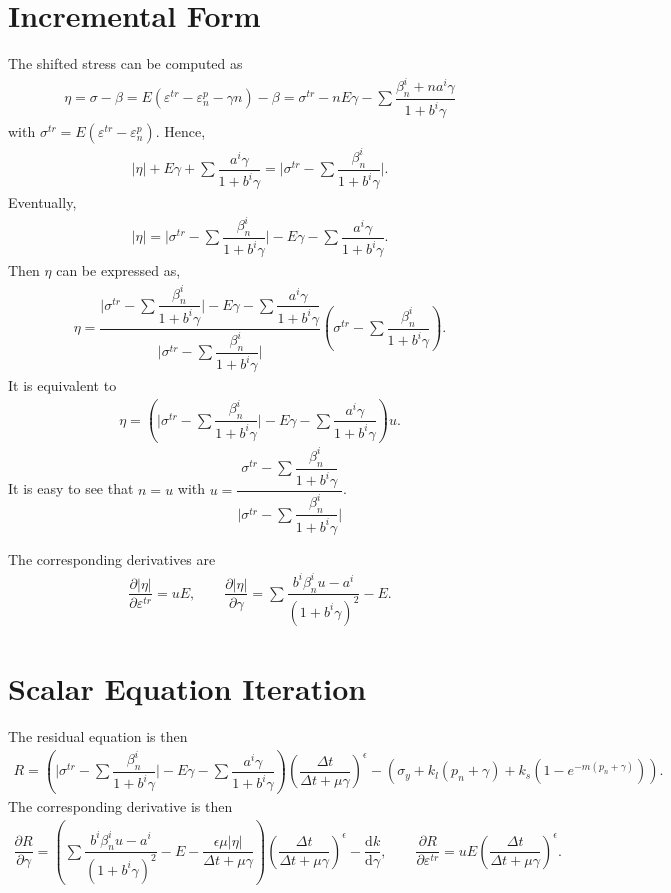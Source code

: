 \documentclass[a4paper,10pt,fleqn]{article}
\newcommand*{\md}[1]{\mathrm{d}#1}
\newcommand*{\pfrac}[2]{\dfrac{\partial#1}{\partial#2}}
\newcommand*{\ddfrac}[2]{\dfrac{\md#1}{\md#2}}
\begin{document}
\section{Incremental Form}
The shifted stress can be computed as
\begin{gather}
\eta=\sigma-\beta=E\left(\varepsilon^{tr}-\varepsilon^p_n-\gamma{}n\right)-\beta=\sigma^{tr}-nE\gamma-\sum\dfrac{\beta_n^i+na^i\gamma}{1+b^i\gamma}
\end{gather}
with $\sigma^{tr}=E(\varepsilon^{tr}-\varepsilon^p_n)$. Hence,
\begin{gather*}
\Big|\eta\Big|+E\gamma+\sum\dfrac{a^i\gamma}{1+b^i\gamma}=\Big|\sigma^{tr}-\sum\dfrac{\beta_n^i}{1+b^i\gamma}\Big|.
\end{gather*}
Eventually,
\begin{gather}
\Big|\eta\Big|=\Big|\sigma^{tr}-\sum\dfrac{\beta_n^i}{1+b^i\gamma}\Big|-E\gamma-\sum\dfrac{a^i\gamma}{1+b^i\gamma}.
\end{gather}
Then $\eta$ can be expressed as,
\begin{gather*}
\eta=\dfrac{\Big|\sigma^{tr}-\sum\dfrac{\beta_n^i}{1+b^i\gamma}\Big|-E\gamma-\sum\dfrac{a^i\gamma}{1+b^i\gamma}}{\Big|\sigma^{tr}-\sum\dfrac{\beta_n^i}{1+b^i\gamma}\Big|}\left(\sigma^{tr}-\sum\dfrac{\beta_n^i}{1+b^i\gamma}\right).
\end{gather*}
It is equivalent to
\begin{gather*}
\eta=\left(\Big|\sigma^{tr}-\sum\dfrac{\beta_n^i}{1+b^i\gamma}\Big|-E\gamma-\sum\dfrac{a^i\gamma}{1+b^i\gamma}\right)u.
\end{gather*}
It is easy to see that $n=u$ with $\displaystyle{}u=\dfrac{\sigma^{tr}-\sum\dfrac{\beta_n^i}{1+b^i\gamma}}{\Big|\sigma^{tr}-\sum\dfrac{\beta_n^i}{1+b^i\gamma}\Big|}$.

The corresponding derivatives are
\begin{gather*}
\pfrac{\Big|\eta\Big|}{\varepsilon^{tr}}=uE,\qquad\pfrac{\Big|\eta\Big|}{\gamma}=\sum\dfrac{b^i\beta_n^iu-a^i}{(1+b^i\gamma)^2}-E.
\end{gather*}
\section{Scalar Equation Iteration}
The residual equation is then
\begin{gather}
R=\left(\Big|\sigma^{tr}-\sum\dfrac{\beta_n^i}{1+b^i\gamma}\Big|-E\gamma-\sum\dfrac{a^i\gamma}{1+b^i\gamma}\right)\left(\dfrac{\Delta{}t}{\Delta{}t+\mu\gamma}\right)^\epsilon-\left(\sigma_y+k_l\left(p_n+\gamma\right)+k_s\left(1-e^{-m\left(p_n+\gamma\right)}\right)\right).
\end{gather}
The corresponding derivative is then
\begin{gather}
\pfrac{R}{\gamma}=\left(\sum\dfrac{b^i\beta_n^iu-a^i}{(1+b^i\gamma)^2}-E-\dfrac{\epsilon\mu\Big|\eta\Big|}{\Delta{}t+\mu\gamma}\right)\left(\dfrac{\Delta{}t}{\Delta{}t+\mu\gamma}\right)^\epsilon-\ddfrac{k}{\gamma},\qquad
\pfrac{R}{\varepsilon^{tr}}=uE\left(\dfrac{\Delta{}t}{\Delta{}t+\mu\gamma}\right)^\epsilon.
\end{gather}
\end{document}
